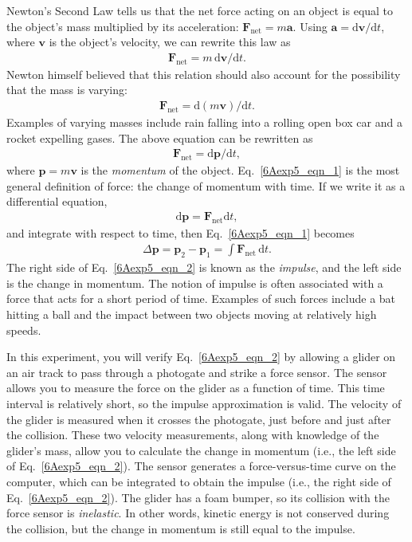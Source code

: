 Newton's Second Law tells us that the net force acting on an object is equal to the object's mass multiplied by its acceleration: \(\textbf{F}_{\textrm{net}} = m\textbf{a}\).  Using \(\textbf{a} = \textrm{d}\textbf{v}/\textrm{d}t\), where \(\textbf{v}\) is the object's velocity, we can rewrite this law as
\begin{align} \textbf{F}_{\textrm{net}} =  m\,\textrm{d}\textbf{v}/\textrm{d}t. \end{align}
Newton himself believed that this relation should also account for the possibility that the mass is varying:
\begin{align} \textbf{F}_{\textrm{net}} = \textrm{d}(m\textbf{v})/\textrm{d}t. \end{align}
Examples of varying masses include rain falling into a rolling open box car and a rocket expelling gases.  The above equation can be rewritten as
\begin{align} \textbf{F}_{\textrm{net}} = \textrm{d}\textbf{p}/\textrm{d}t, \label{6Aexp5_eqn_1} \end{align}
where \(\textbf{p} = m\textbf{v}\) is the \textit{momentum} of the object.  Eq.~\ref{6Aexp5_eqn_1} is the most general definition of force: the change of momentum with time.  If we write it as a differential equation,
\begin{align} \textrm{d}\textbf{p} = \textbf{F}_{\textrm{net}} \textrm{d}t, \end{align}
and integrate with respect to time, then Eq.~\ref{6Aexp5_eqn_1} becomes
\begin{align} \Delta \textbf{p} = \textbf{p}_2 - \textbf{p}_1 = \int \textbf{F}_{\textrm{net}}\,\textrm{d}t. \label{6Aexp5_eqn_2} \end{align}
The right side of Eq.~\ref{6Aexp5_eqn_2} is known as the \textit{impulse}, and the left side is the change in momentum.  The notion of impulse is often associated with a force that acts for a short period of time.  Examples of such forces include a bat hitting a ball and the impact between two objects moving at relatively high speeds.

In this experiment, you will verify Eq.~\ref{6Aexp5_eqn_2} by allowing a glider on an air track to pass through a photogate and strike a force sensor.  The sensor allows you to measure the force on the glider as a function of time.  This time interval is relatively short, so the impulse approximation is valid.  The velocity of the glider is measured when it crosses the photogate, just before and just after the collision.  These two velocity measurements, along with knowledge of the glider's mass, allow you to calculate the change in momentum (i.e., the left side of Eq.~\ref{6Aexp5_eqn_2}).  The sensor generates a force-versus-time curve on the computer, which can be integrated to obtain the impulse (i.e., the right side of Eq.~\ref{6Aexp5_eqn_2}).  The glider has a foam bumper, so its collision with the force sensor is \textit{inelastic}.  In other words, kinetic energy is not conserved during the collision, but the change in momentum is still equal to the impulse.



